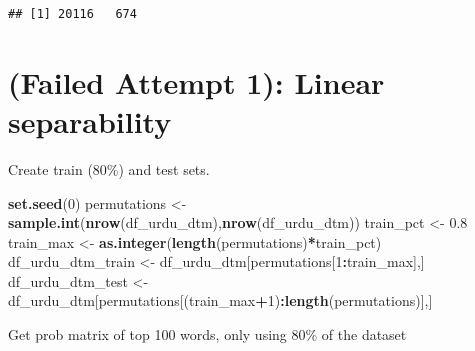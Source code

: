 \documentclass[
]{article}
\newenvironment{Shaded}{\begin{snugshade}}{\end{snugshade}}
\newcommand{\DecValTok}[1]{\textcolor[rgb]{0.00,0.00,0.81}{#1}}
\newcommand{\FloatTok}[1]{\textcolor[rgb]{0.00,0.00,0.81}{#1}}
\newcommand{\KeywordTok}[1]{\textcolor[rgb]{0.13,0.29,0.53}{\textbf{#1}}}
\newcommand{\NormalTok}[1]{#1}
\newcommand{\OperatorTok}[1]{\textcolor[rgb]{0.81,0.36,0.00}{\textbf{#1}}}
\newcommand{\StringTok}[1]{\textcolor[rgb]{0.31,0.60,0.02}{#1}}
\begin{document}
\begin{verbatim}
## [1] 20116   674
\end{verbatim}

\hypertarget{failed-attempt-1-linear-separability}{%
\section{(Failed Attempt 1): Linear
separability}\label{failed-attempt-1-linear-separability}}

Create train (80\%) and test sets.

\begin{Shaded}
\begin{Highlighting}[]
\KeywordTok{set.seed}\NormalTok{(}\DecValTok{0}\NormalTok{)}
\NormalTok{permutations \textless{}{-}}\StringTok{ }\KeywordTok{sample.int}\NormalTok{(}\KeywordTok{nrow}\NormalTok{(df\_urdu\_dtm),}\KeywordTok{nrow}\NormalTok{(df\_urdu\_dtm))}
\NormalTok{train\_pct \textless{}{-}}\StringTok{ }\FloatTok{0.8}
\NormalTok{train\_max \textless{}{-}}\StringTok{ }\KeywordTok{as.integer}\NormalTok{(}\KeywordTok{length}\NormalTok{(permutations)}\OperatorTok{*}\NormalTok{train\_pct)}
\NormalTok{df\_urdu\_dtm\_train \textless{}{-}}\StringTok{ }\NormalTok{df\_urdu\_dtm[permutations[}\DecValTok{1}\OperatorTok{:}\NormalTok{train\_max],]}
\NormalTok{df\_urdu\_dtm\_test \textless{}{-}}\StringTok{ }\NormalTok{df\_urdu\_dtm[permutations[(train\_max}\OperatorTok{+}\DecValTok{1}\NormalTok{)}\OperatorTok{:}\KeywordTok{length}\NormalTok{(permutations)],]}
\end{Highlighting}
\end{Shaded}

Get prob matrix of top 100 words, only using 80\% of the dataset
\end{document}

